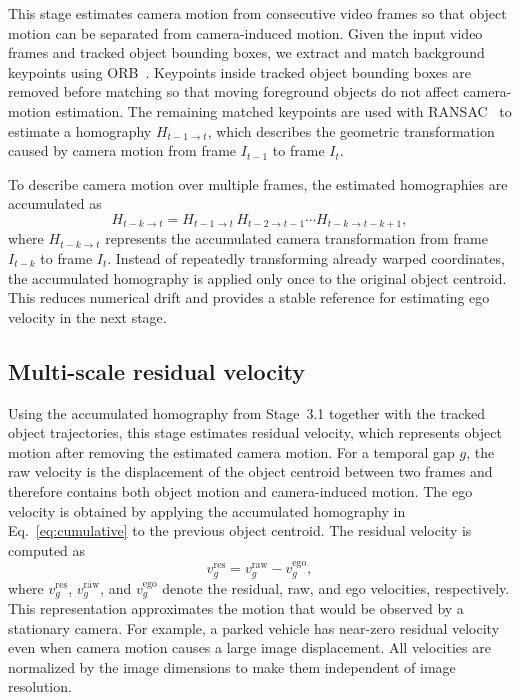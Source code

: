 \documentclass[sigconf,anonymous,nonacm]{acmart}
\begin{document}
This stage estimates camera motion from consecutive video frames so that object motion can be separated from camera-induced motion. Given the input video frames and tracked object bounding boxes, we extract and match background keypoints using ORB~\cite{orb}. Keypoints inside tracked object bounding boxes are removed before matching so that moving foreground objects do not affect camera-motion estimation. The remaining matched keypoints are used with RANSAC~\cite{ransac} to estimate a homography $H_{t-1\to t}$, which describes the geometric transformation caused by camera motion from frame $I_{t-1}$ to frame $I_t$.

To describe camera motion over multiple frames, the estimated homographies are accumulated as
\begin{equation}
H_{t-k\to t} = H_{t-1\to t}\, H_{t-2\to t-1} \cdots H_{t-k\to t-k+1},
\label{eq:cumulative}
\end{equation}
where $H_{t-k\to t}$ represents the accumulated camera transformation from frame $I_{t-k}$ to frame $I_t$. Instead of repeatedly transforming already warped coordinates, the accumulated homography is applied only once to the original object centroid. This reduces numerical drift and provides a stable reference for estimating ego velocity in the next stage.

\subsection{Multi-scale residual velocity}
\label{sec:residual}

Using the accumulated homography from Stage~3.1 together with the tracked object trajectories, this stage estimates residual velocity, which represents object motion after removing the estimated camera motion. For a temporal gap $g$, the raw velocity is the displacement of the object centroid between two frames and therefore contains both object motion and camera-induced motion. The ego velocity is obtained by applying the accumulated homography in Eq.~\ref{eq:cumulative} to the previous object centroid. The residual velocity is computed as
\begin{equation}
v^{\mathrm{res}}_{g} = v^{\mathrm{raw}}_{g} - v^{\mathrm{ego}}_{g},
\label{eq:residual}
\end{equation}
where $v^{\mathrm{res}}_g$, $v^{\mathrm{raw}}_g$, and $v^{\mathrm{ego}}_g$ denote the residual, raw, and ego velocities, respectively. This representation approximates the motion that would be observed by a stationary camera. For example, a parked vehicle has near-zero residual velocity even when camera motion causes a large image displacement. All velocities are normalized by the image dimensions to make them independent of image resolution.
\end{document}
